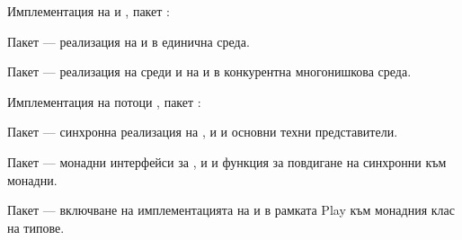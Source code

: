 \begin{attachment}{Имплементация на  и }
  \label{att:future-promise}
  , пакет :
  
  \begin{itemize*}
    \item Пакет  — реализация на  и  в единична среда.
    
    \item Пакет  — реализация на среди и на  и  в конкурентна многонишкова среда.
  \end{itemize*}
\end{attachment}

\begin{attachment}{Имплементация на  потоци}
  \label{att:iteratees}
  , пакет :
  
  \begin{itemize*}
    \item Пакет  — синхронна реализация на ,  и  и основни техни представители.
    
    \item Пакет  — монадни интерфейси за ,  и  и функция за повдигане на синхронни  към монадни.
    
    \item Пакет  — включване на имплементацията на  и  в рамката Play към монадния клас на типове.
  \end{itemize*}
\end{attachment}

